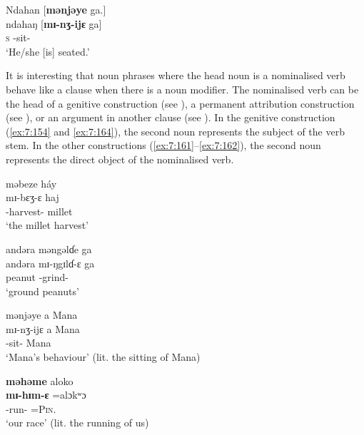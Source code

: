 \ea\label{ex:7:160}
Ndahan  [\textbf{mənjəye}  ga.]\\
\gll  ndahaŋ  [\textbf{mɪ-nʒ-ijɛ}  ga]\\
      \textsc{s}    {\NOM}{}-sit-{\CL}  {\ADJ}\\
\glt  ‘He/she [is] seated.’\\
\z 

It is interesting that noun phrases where the head noun is a nominalised verb behave like a clause when there is a noun modifier. The nominalised verb can be the head of a genitive construction (see ), a permanent attribution construction (see ), or an argument in another clause (see ). In the genitive construction (\ref{ex:7:154} and \ref{ex:7:164}), the second noun represents the subject of the verb stem. In the other constructions (\ref{ex:7:161}--\ref{ex:7:162}), the second noun represents the direct object of the nominalised verb. 

\ea\label{ex:7:161}
məbeze  háy\\
\gll  mɪ-bɛʒ-ɛ     haj\\
      {\NOM}{}-harvest-{\CL}  millet\\
\glt  ‘the millet harvest’\\
\z 

\ea\label{ex:7:162}
andəra  məngəlɗe  ga\\
\gll  andəra  mɪ-ŋgɪlɗ-ɛ    ga\\
      peanut   {\NOM}{}-grind-{\CL}    {\ADJ}\\
\glt  ‘ground peanuts’\\
\z 

\ea\label{ex:7:163}
mənjəye  a  Mana\\
\gll  mɪ-nʒ-ijɛ     a   Mana\\
      {\NOM}{}-sit-{\CL}    {\GEN}  Mana\\
\glt  ‘Mana’s behaviour’ (lit. the sitting of Mana)\\
\z 

\ea\label{ex:7:164}
\textbf{məhəme}  aloko\\
\gll  \textbf{mɪ-hɪm-ɛ}    =alɔkʷɔ\\
      {\NOM}{}-run-{\CL}    =\textsc{Pin}.{\POSS}\\
\glt  ‘our race’ (lit. the running of us)\\
\z 

